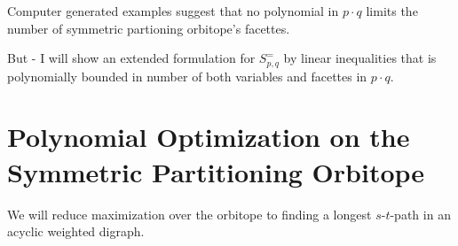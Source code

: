 \documentclass[a4paper]{amsart}
\theoremstyle{lemma}
\theoremstyle{definition}
\theoremstyle{remark}
\newcommand{\M}{\ensuremath{\mathcal{M}}}
\begin{document}







Computer generated examples suggest that no polynomial in \(p \cdot
q\) limits the number of  symmetric partioning orbitope's
facettes.

But - I will show an extended formulation for \(S^=_{p, q}\) by linear
inequalities that is polynomially bounded in number of both variables
and facettes in \(p \cdot q\).






\section{Polynomial Optimization on the  Symmetric Partitioning
  Orbitope}
\label{fluss}
We will reduce maximization over the orbitope to finding a longest
\(s\)-\(t\)-path in an acyclic weighted digraph.
\end{document}
